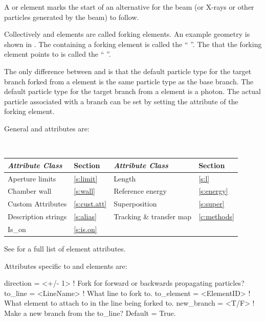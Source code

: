 A  or  element marks the start of an
alternative  for the beam (or X-rays or other
particles generated by the beam) to follow. 

Collectively  and  elements are called
forking elements. An example geometry is shown in .  The
 containing a forking element is called the ``
''. The  that the forking element points to is
called the `` ''. 

The only difference between  and  is that the
default particle type for the target branch forked from a 
element is the same particle type as the base branch. The default
particle type for the target branch from a  element is
a photon. The actual particle associated with a branch can be set by
setting the  attribute of the forking element.

General  and  attributes are:
\begin{center}
\tt
\begin{tabular}{llll} \toprule
  {\sl Attribute Class}      & Section           & {\sl Attribute Class}      & Section         \\ \midrule
  Aperture limits            & \ref{s:limit}     & Length                     & \ref{s:l}       \\
  Chamber wall               & \ref{s:wall}      & Reference energy           & \ref{s:energy}  \\ 
  Custom Attributes          & \ref{s:cust.att}  & Superposition              & \ref{s:super}   \\
  Description strings        & \ref{s:alias}     & Tracking \& transfer map   & \ref{c:methods} \\ 
  Is_on                      & \ref{s:is.on}     &                            &                 \\
  \bottomrule
\end{tabular}
\end{center}
\toffset
See  for a full list of element attributes.

Attributes specific to  and  elements are:
\begin{example}
  direction    = <+/- 1>      ! Fork for forward or backwards propagating particles?
  to_line      = <LineName>   ! What line to fork to.
  to_element   = <ElementID>  ! What element to attach to in the line being forked to.
  new_branch   = <T/F>        ! Make a new branch from the to_line? Default = True.
\end{example}

